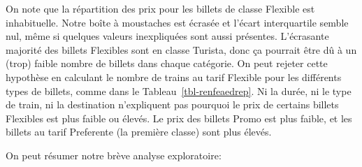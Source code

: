 \documentclass[
  11pt,
  letterpaper,
]{scrbook}
\theoremstyle{definition}
\theoremstyle{remark}
\begin{document}
On note que la répartition des prix pour les billets de classe Flexible
est inhabituelle. Notre boîte à moustaches est écrasée et l'écart
interquartile semble nul, même si quelques valeurs inexpliquées sont
aussi présentes. L'écrasante majorité des billets Flexibles sont en
classe Turista, donc ça pourrait être dû à un (trop) faible nombre de
billets dans chaque catégorie. On peut rejeter cette hypothèse en
calculant le nombre de trains au tarif Flexible pour les différents
types de billets, comme dans le Tableau~\ref{tbl-renfeaedrep}. Ni la
durée, ni le type de train, ni la destination n'expliquent pas pourquoi
le prix de certains billets Flexibles est plus faible ou élevés. Le prix
des billets Promo est plus faible, et les billets au tarif Preferente
(la première classe) sont plus élevés.

On peut résumer notre brève analyse exploratoire:
\end{document}
